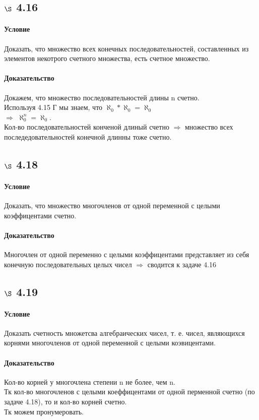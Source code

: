\documentclass[a4paper,12pt]{article}
\begin{document}
\subsection*{$\S$ 4.16}
\paragraph*{Условие}
Доказать, что множество всех конечных последовательностей, составленных из элементов некотрого счетного множества, есть счетное множество.
\paragraph*{Доказательство}
Докажем, что множество последовательностей длины n счетно.\\
Используя 4.15 Г мы знаем, что $\aleph_0 * \aleph_0 = \aleph_0$\\
$ \Rightarrow $ $\aleph_0^{n} = \aleph_0 $.\\
Кол-во последовательностей конченой длиный счетно $\Rightarrow$ множество всех последедовательностей конечной длинны тоже счетно.


\subsection*{$\S$ 4.18}
\paragraph*{Условие}
Доказать, что множество многочленов от одной переменной с целыми коэффицентами счетно.
\paragraph*{Доказательство}
Многочлен от одной переменно с целыми коэффицентами представляет из себя конечную последовательных целых чисел $\Rightarrow$ сводится к задаче 4.16

\subsection*{$\S$ 4.19}
\paragraph*{Условие}
Доказать счетность множетсва алгебраических чисел, т. е. чисел, являющихся корнями многочленов от одной переменной с целыми коэвицентами.
\paragraph*{Доказательство}
Кол-во корней у многочлена степени n не более, чем n.\\
Тк кол-во многочленов с целыми коеффицентами от одной перменной счетно (по задаче 4.18), то и кол-во корней счетно.\\
Тк можем пронумеровать.
\end{document}
